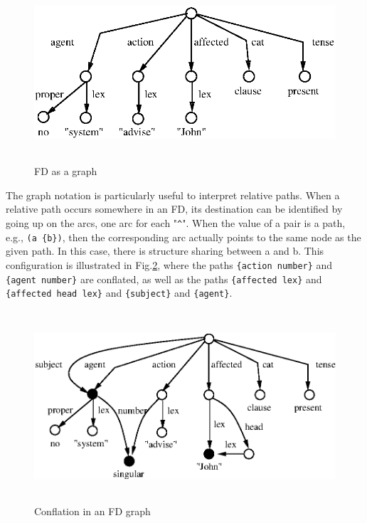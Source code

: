 \documentclass[10pt,a4paper]{report}
\begin{document}
\begin{figure}[p]
    \centering
    \includegraphics[width=5in, height=2.6in]{graph12.eps}
    \caption{FD as a graph}
    \label{fig3:graph1}
\end{figure}

The graph notation is particularly useful to interpret relative paths. 
When a relative path occurs somewhere in an FD, its destination can be
identified by  going up on the arcs, one arc for each "{\tt \^{}}". 
When the value of a pair is a path, e.g., {\tt (a \{b\})}, then 
the corresponding arc actually points to the same node as the
given path. In this case, there is structure sharing between a and b. This
configuration is illustrated in Fig.\ref{fig3:graph2}, where the paths
{\tt \{action number\}} and {\tt \{agent number\}} are conflated, as well as the
paths {\tt \{affected lex\}} and {\tt \{affected head lex\}} and {\tt \{subject\}} and
{\tt \{agent\}}.  

\begin{figure}[p]
    \centering
    \includegraphics[width=5in, height=2.8in]{graph22.eps}
    \caption{Conflation in an FD graph}
    \label{fig3:graph2}
\end{figure}
\end{document}
